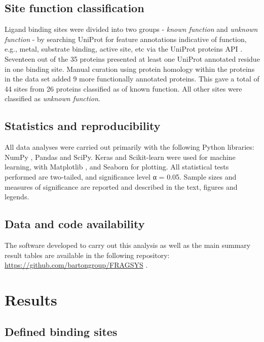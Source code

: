\subsection{Site function classification}

Ligand binding sites were divided into two groups - \textit{known function} and \textit{unknown function} - by searching UniProt \cite{UNIPROT_2019_UNIPROT} for feature annotations indicative of function, e.g., metal, substrate binding, active site, etc via the UniProt proteins API \cite{NIGHTINGALE_2017_API}. Seventeen out of the 35 proteins presented at least one UniProt annotated residue in one binding site. Manual curation using protein homology within the proteins in the data set added 9 more functionally annotated proteins. This gave a total of 44 sites from 26 proteins classified as of known function. All other sites were classified as \textit{unknown function}.

\subsection{Statistics and reproducibility}

All data analyses were carried out primarily with  the following Python libraries: NumPy \cite{HARRIS_2020_NUMPY}, Pandas \cite{MCKINNEY_2010_PANDAS,PANDAS_2022_PANDAS} and SciPy. Keras and Scikit-learn were used for machine learning, with Matplotlib \cite{HUNTER_2007_MATPLOTLIB}, and Seaborn \cite{WASKOM_2021_SEABORN} for plotting. All statistical tests performed are two-tailed, and significance level α = 0.05. Sample sizes and measures of significance are reported and described in the text, figures and legends.

\subsection{Data and code availability}

The software developed to carry out this analysis as well as the main summary result tables are available in the following repository: \url{https://github.com/bartongroup/FRAGSYS} \cite{UTGES_2024_FRAGSYS_ZENODO}.

\section{Results}

\subsection{Defined binding sites}

